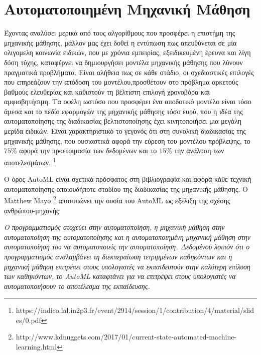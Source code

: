 \section{Αυτοματοποιημένη Μηχανική Μάθηση}
 Έχοντας αναλύσει μερικά από τους αλγορίθμους που προσφέρει η επιστήμη της μηχανικής μάθησης, μάλλον μας έχει δοθεί η εντύπωση πως απευθύνεται σε μία ολιγομελη κοινωνία ειδικών, που με χρόνια εμπειρίας, εξειδικευμένη έρευνα και λίγη δόση τύχης, καταφέρνει να δημιουργήσει μοντέλα μηχανικής μάθησης που λύνουν πραγματικά προβλήματα. Είναι αλήθεια πως σε κάθε στάδιο, οι σχεδιαστικές επιλογές που επηρεάζουν την απόδοση του μοντέλου,προσθέτουν στο πρόβλημα αρκετούς βαθμούς ελευθερίας και καθιστούν τη βέλτιστη επιλογή χρονοβόρα και αμφισβητήσιμη. Τα οφέλη ωστόσο που προσφέρει ένα αποδοτικό μοντέλο είναι τόσο άμεσα και το πεδίο εφαρμογών της μηχανικής μάθησης τόσο ευρύ, που η ιδέα της αυτοματοποίησης της διαδικασίας βελτιστοποίησης έχει κινητοποιήσει μια μεγάλη μερίδα ειδικών. Είναι χαρακτηριστικό
 το γεγονός ότι στη συνολική διαδικασίας της μηχανικής μάθησης, που ουσιαστικά αφορά την εύρεση του μοντέλου πρόβλεψης, το $75\%$ αφορά την προετοιμασία των δεδομένων και το $15\%$ την ανάλυση των αποτελεσμάτων. \footnote{https://indico.lal.in2p3.fr/event/2914/session/1/contribution/4/material/slides/0.pdf}
 
 Ο όρος AutoML είναι σχετικά πρόσφατος στη βιβλιογραφία και αφορά κάθε τεχνική
 αυτοματοποίησης οποιουδήποτε σταδίου της διαδικασίας της μηχανικής μάθησης. Ο Matthew Mayο \footnote{http://www.kdnuggets.com/2017/01/current-state-automated-machine-learning.html} αποτυπώνει την ουσία του AutoML ως εξέλιξη της σχέσης ανθρώπου-μηχανής:
 
 \begin{displayquote}
 \textit{Ο προγραμματισμός στοχεύει στην αυτοματοποίηση, η μηχανική μάθηση στην αυτοματοποίηση της αυτοματοποίησης και η αυτοματοποιημένη μηχανική μάθηση στην αυτοματοποίηση του να αυτοματοποιείς την αυτοματοποίηση. Δεδομένου λοιπόν ότι ο προγραμματισμός αναλαμβάνει τη διεκπεραίωση τετριμμένων καθηκόντων και η μηχανική μάθηση επιτρέπει στους υπολογιστές να εκπαιδευτούν στην καλύτερη επίλυση των καθηκόντων, το AutoML καταφτάνει για να επιτρέψει στους υπολογιστές να αυτοματοποιήσουν το αποτέλεσμα της εκπαίδευσης.}
 \end{displayquote}
 
